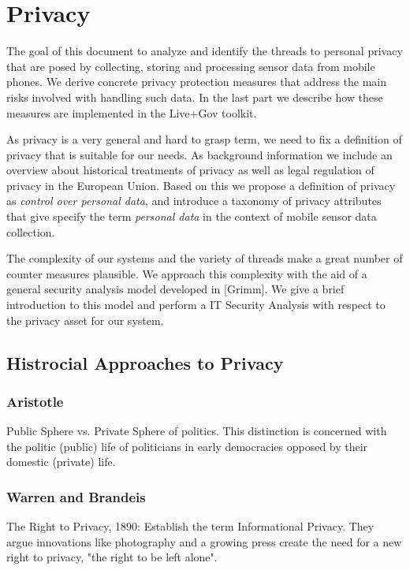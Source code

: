 \section{Privacy}

The goal of this document to analyze and identify the threads to personal privacy that are posed by collecting, storing and processing sensor data from mobile phones.
We derive concrete privacy protection measures that address the main risks involved with handling such data.
In the last part we describe how these measures are implemented in the Live+Gov toolkit.

As privacy is a very general and hard to grasp term, we need to fix a definition of privacy that is suitable for our needs.
As background information we include an overview about historical treatments of privacy as well as legal regulation of privacy in the European Union.
Based on this we propose a definition of privacy as {\em control over personal data}, and introduce a taxonomy of privacy attributes that give specify the term {\em personal data} in the context of mobile
sensor data collection.

The complexity of our systems and the variety of threads make a great number of counter measures plausible.
We approach this complexity with the aid of a general security analysis model developed in [Grimm].
We give a brief introduction to this model and perform a IT Security Analysis with respect to the privacy asset for our system.

\subsection{Histrocial Approaches to Privacy}

\subsubsection{Aristotle}

Public Sphere vs. Private Sphere of politics. This distinction is concerned with the politic (public) life of politicians in early democracies opposed by their domestic (private) life.

\subsubsection{Warren and Brandeis}

The Right to Privacy, 1890: Establish the term Informational Privacy. They argue innovations like photography and a growing press create the need for a new right to privacy, "the right to be left alone".

